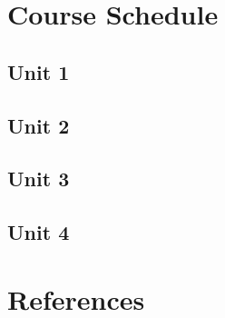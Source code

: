 \documentclass[]{article}
\begin{document}
\hypertarget{course-schedule}{%
\section{Course Schedule}\label{course-schedule}}

\hypertarget{unit-1}{%
\subsection{Unit 1}\label{unit-1}}

\hypertarget{unit-2}{%
\subsection{Unit 2}\label{unit-2}}

\hypertarget{unit-3}{%
\subsection{Unit 3}\label{unit-3}}

\hypertarget{unit-4}{%
\subsection{Unit 4}\label{unit-4}}

\hypertarget{references}{%
\section*{References}\label{references}}

\setlength{\parindent}{-0.2in}
\setlength{\leftskip}{0.2in}
\setlength{\parskip}{8pt}

\noindent

\printindex
\end{document}
